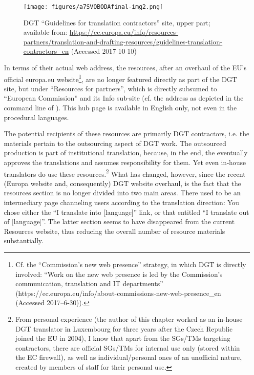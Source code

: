 \documentclass[output=paper]{langsci/langscibook}
\begin{document}
\newpage 
\begin{figure}
\caption{DGT “Guidelines for translation contractors” site, upper part; available from: \url{https://ec.europa.eu/info/resources-partners/translation-and-drafting-resources/guidelines-translation-contractors_en} (Accessed 2017-10-10)}
\label{fig:svoboda:2}
\texttt{[image: figures/a7SVOBODAfinal-img2.png]}
\end{figure}

 


In terms of their actual web address, the resources, after an overhaul of the EU’s official europa.eu website\footnote{Cf. the “Commission's new web presence” strategy, in which DGT is directly involved: “Work on the new web presence is led by the Commission’s communication, translation and IT departments” (https://ec.europa.eu/info/about-commissions-new-web-presence\_en (Accessed 2017–6-30)).}, are no longer featured directly as part of the DGT site, but under “Resources for partners”, which is directly subsumed to “European Commission” and its Info sub-site (cf. the address as depicted in the command line of ). This hub page is available in English only, not even in the procedural languages.

The potential recipients of these resources are primarily DGT contractors, i.e. the materials pertain to the outsourcing aspect of DGT work. The outsourced production is part of institutional translation, because, in the end, the \citeauthor{DGT2008} eventually approves the translations and assumes responsibility for them. Yet even in-house translators do use these resources.\footnote{From personal experience (the author of this chapter worked as an in-house DGT translator in Luxembourg for three years after the Czech Republic joined the EU in 2004), I know that apart from the SGs/TMs targeting contractors, there are official SGs/TMs for internal use only (stored within the EC firewall), as well as individual/personal ones of an unofficial nature, created by members of staff for their personal use.} What has changed, however, since the recent (Europa website and, consequently) DGT website overhaul, is the fact that the resources section is no longer divided into two main areas. There used to be an intermediary page channeling users according to the translation direction: You chose either the “I translate into [language]” link, or that entitled “I translate out of [language]”. The latter section seems to have disappeared from the current Resources website, thus reducing the overall number of resource materials substantially.
\end{document}
